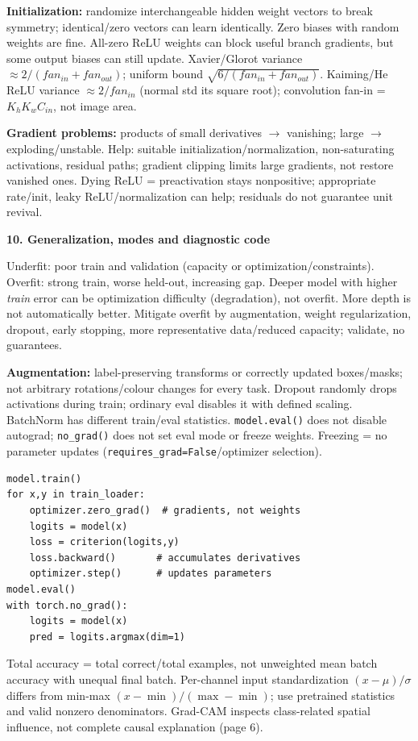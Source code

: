 \documentclass[a4paper]{article}
\newcommand{\key}[1]{\textbf{#1}}
\newcommand{\Topic}[1]{\par\vspace{1.7pt}\noindent
  {\fontsize{7.7}{8.0}\selectfont\bfseries #1}\par\vspace{0.3pt}}
\newcounter{sheet}
\newcounter{sheetcolumn}
\newlength{\colwidth}
\newenvironment{sheetcol}[1][7.0]{\stepcounter{sheetcolumn}
  \begin{lrbox}{\columnbox}\begin{minipage}[t]{\colwidth}\vspace{0pt}
  \fontsize{#1}{\dimexpr#1pt+0.6pt\relax}\selectfont}
  {\end{minipage}\end{lrbox}
  \typeout{CV1COL|\thesheet|\thesheetcolumn|\the\dimexpr\ht\columnbox+\dp\columnbox\relax}
  \usebox{\columnbox}\ignorespacesafterend}
\begin{document}
\begin{sheetcol}
\key{Initialization:} randomize interchangeable hidden weight vectors to break symmetry; identical/zero vectors can learn identically. Zero biases with random weights are fine. All-zero ReLU weights can block useful branch gradients, but some output biases can still update. Xavier/Glorot variance \(\approx2/(fan_{in}+fan_{out})\); uniform bound \(\sqrt{6/(fan_{in}+fan_{out})}\). Kaiming/He ReLU variance \(\approx2/fan_{in}\) (normal std its square root); convolution fan-in = \(K_hK_wC_{in}\), not image area.

\key{Gradient problems:} products of small derivatives \(\to\) vanishing; large \(\to\) exploding/unstable. Help: suitable initialization/normalization, non-saturating activations, residual paths; gradient clipping limits large gradients, not restore vanished ones. Dying ReLU = preactivation stays nonpositive; appropriate rate/init, leaky ReLU/normalization can help; residuals do not guarantee unit revival.

\Topic{10. Generalization, modes and diagnostic code}
Underfit: poor train and validation (capacity or optimization/constraints). Overfit: strong train, worse held-out, increasing gap. Deeper model with higher \emph{train} error can be optimization difficulty (degradation), not overfit. More depth is not automatically better. Mitigate overfit by augmentation, weight regularization, dropout, early stopping, more representative data/reduced capacity; validate, no guarantees.

\key{Augmentation:} label-preserving transforms or correctly updated boxes/masks; not arbitrary rotations/colour changes for every task. Dropout randomly drops activations during train; ordinary eval disables it with defined scaling. BatchNorm has different train/eval statistics. \texttt{model.eval()} does not disable autograd; \texttt{no\_grad()} does not set eval mode or freeze weights. Freezing = no parameter updates (\texttt{requires\_grad=False}/optimizer selection).
\begin{lstlisting}
model.train()
for x,y in train_loader:
    optimizer.zero_grad()  # gradients, not weights
    logits = model(x)
    loss = criterion(logits,y)
    loss.backward()       # accumulates derivatives
    optimizer.step()      # updates parameters
model.eval()
with torch.no_grad():
    logits = model(x)
    pred = logits.argmax(dim=1)
\end{lstlisting}
Total accuracy = total correct/total examples, not unweighted mean batch accuracy with unequal final batch. Per-channel input standardization \((x-\mu)/\sigma\) differs from min-max \((x-\min)/(\max-\min)\); use pretrained statistics and valid nonzero denominators. Grad-CAM inspects class-related spatial influence, not complete causal explanation (page 6).


\end{sheetcol}
\end{document}
